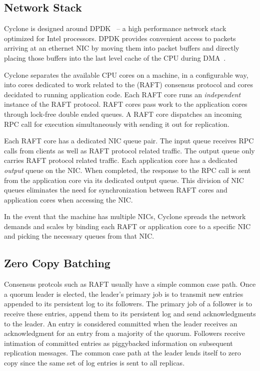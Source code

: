 \documentclass[letterpaper,twocolumn,10pt]{article}
\begin{document}
\subsection{Network Stack}
Cyclone is designed around DPDK~\cite{dpdk} -- a high performance network stack
optimized for Intel processors. DPDK provides convenient access to packets
arriving at an ethernet NIC by moving them into packet buffers and directly
placing those buffers into the last level cache of the CPU during DMA~\cite{ddio}.

Cyclone separates the available CPU cores on a machine, in a configurable way,
into cores dedicated to work related to the (RAFT) consensus protocol and cores
decidated to running application code. Each RAFT core runs an \emph{independent}
instance of the RAFT protocol. RAFT cores pass work to the application cores
through lock-free double ended queues. A RAFT core dispatches an incoming RPC
call for execution simultaneously with sending it out for replication.

Each RAFT core has a dedicated NIC queue pair. The input queue receives RPC
calls from clients as well as RAFT protocol related traffic. The output queue
only carries RAFT protocol related traffic. Each application core has a
dedicated \emph{output} queue on the NIC. When completed, the response to the
RPC call is sent from the application core via its dedicated output queue. This
division of NIC queues eliminates the need for synchronization between RAFT
cores and application cores when accessing the NIC.

In the event that the machine has multiple NICs, Cyclone spreads the network
demands and scales by binding each RAFT or application core to a specific NIC
and picking the necessary queues from that NIC.

\subsection{Zero Copy Batching}
Consensus protcols such as RAFT usually have a simple common case path. Once a
quorum leader is elected, the leader's primary job is to transmit new entries
appended to its persistent log to its followers. The primary job of a follower
is to receive these entries, append them to its persistent log and send
acknowledgments to the leader. An entry is considered committed when the leader
receives an acknowledgment for an entry from a majority of the quorum. Followers
receive intimation of committed entries as piggybacked information on subsequent
replication messages. The common case path at the leader lends itself to zero
copy since the same set of log entries is sent to all replicas.
\end{document}
